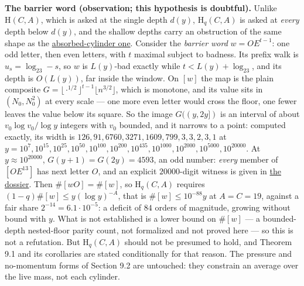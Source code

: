 \documentclass[11pt,a4paper]{article}
\begin{document}
\textbf{The barrier word (observation; this hypothesis is doubtful).}
Unlike \(\mathrm H(C,A)\), which is asked at the single depth \(d(y)\),
\(\mathrm H_q(C,A)\) is asked at \emph{every} depth below \(d(y)\), and
the shallow depths carry an obstruction of the same shape as the
\href{https://github.com/sneakyweasel/btlab/blob/main/docs/problems/juggler_absorbed_cylinder.md}{absorbed-cylinder
one}. Consider the \emph{barrier word} \(w=OE^{t-1}\): one odd letter,
then even letters, with \(t\) maximal subject to badness. Its prefix
walk is \(u_s=\log_23-s\), so \(w\) is \(L(y)\)-bad exactly while
\(t<L(y)+\log_23\), and its depth is \(O(L(y))\), far inside the window.
On \([w]\) the map is the plain composite
\(G=\lfloor\cdot^{1/2}\rfloor^{t-1}\lfloor n^{3/2}\rfloor\), which is
monotone, and its value sits in \((N_0,N_0^2)\) at every scale --- one
more even letter would cross the floor, one fewer leaves the value below
its square. So the image \(G((y,2y])\) is an interval of about
\(v_0\log v_0/\log y\) integers with \(v_0\) bounded, and it narrows to
a point: computed exactly, its width is
\(126,91,6760,3271,1609,799,3,3,2,3,1\) at
\(y=10^{7},10^{15},10^{25},10^{50},10^{100},10^{200},10^{435},10^{1000},
10^{2000},10^{5000},10^{20000}\). At \(y\approx10^{20000}\),
\(G(y+1)=G(2y)=4593\), an odd number: \emph{every} member of
\([OE^{13}]\) has next letter \(O\), and an explicit \(20000\)-digit
witness is given in
\href{https://github.com/sneakyweasel/btlab/blob/main/docs/problems/juggler_barrier_collapse.md}{the
dossier}. Then \(\#[wO]=\#[w]\), so \(\mathrm H_q(C,A)\) requires
\((1-q)\#[w]\le y(\log y)^{-A}\), that is \(\#[w]\le10^{-88}y\) at
\(A=C=19\), against a fair share \(2^{-14}=6.1\cdot10^{-5}\): a deficit
of \(84\) orders of magnitude, growing without bound with \(y\). What is
not established is a lower bound on \(\#[w]\) --- a bounded-depth
nested-floor parity count, not formalized and not proved here --- so
this is not a refutation. But \(\mathrm H_q(C,A)\) should not be
presumed to hold, and Theorem 9.1 and its corollaries are stated
conditionally for that reason. The pressure and no-momentum forms of
Section 9.2 are untouched: they constrain an average over the live mass,
not each cylinder.
\end{document}
